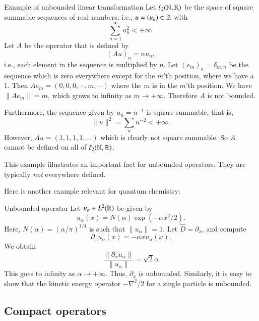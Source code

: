 \begin{myExample}{Example of unbounded linear transformation}{}
    Let $\ell_2(\mathbb{N},\mathbb{R})$ be the space of square summable sequences of real numbers, i.e., $u = (u_n) \subset \mathbb{R}$ with 
    \[ \sum_{n=1}^\infty u_n^2 < +\infty. \]
    Let $A$ be the operator that is defined by
    $$ (Au)_n = n u_n, $$
    i.e., each element in the sequence is multiplied by $n$. Let $(e_m)_n = \delta_{m,n}$ be the sequence which is zero everywhere except for the $m$'th position, where we have a 1. Then $Ae_m = (0,0,0,\cdots,m,\cdots)$ where the $m$ is in the $m$'th position. We have $\|A e_m\| = m$, which grows to infinity as $m\to+\infty$. Therefore $A$ is not bounded.

    Furthermore, 
    the sequence given by $u_n = n^{-1}$ is square summable, that is,
    $$ \| u \|^2 = \sum_n n^{-2} < +\infty. $$
    However, $Au = (1, 1, 1, 1, \dots)$ which is clearly not square summable. So $A$ cannot be defined on all of $\ell_2(\mathbb{N},\mathbb{R})$.
\end{myExample}

This example illustrates an important fact for unbounded operators: They are typically \emph{not} everywhere defined.

Here is another example relevant for quantum chemistry:

\begin{myExample}{Unbounded operator}{}
 Let $u_\alpha \in L^2(\mathbb{R})$ be given by
 \begin{equation}
     u_\alpha(x) = N(\alpha) \exp(-\alpha x^2/2).
 \end{equation}
    Here, $N(\alpha) = (\alpha/\pi)^{1/4}$ is such that $\|u_\alpha\|=1$.
Let $\hat{D} = \partial_x$, and compute
 \begin{equation}
    \partial_x u_\alpha(x) = -\alpha x u_\alpha(x).
 \end{equation}
 We obtain
 \begin{equation}
     \frac{\|\partial_x u_\alpha\|}{\|u_\alpha\|} = \sqrt{2} \alpha %
 \end{equation}
 This goes to infinity as $\alpha \to +\infty$. Thus, $\partial_x$ is unbounded.
 Similarly, it is easy to show that the kinetic energy operator $-\nabla^2/2$ for a single particle is unbounded.
\end{myExample}


\subsection{Compact operators}

